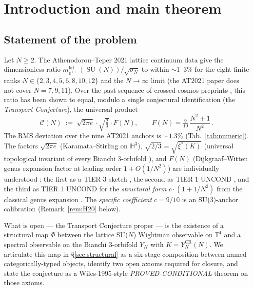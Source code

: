 \documentclass[11pt,a4paper,reqno]{amsart}
\theoremstyle{definition}
\DeclareMathOperator{\SU}{SU}
\newcommand{\YK}{Y_K}
\newcommand{\YKCR}{Y_K^{\mathrm{CR}}}
\newcommand{\HH}{\mathbb{H}}
\newcommand{\TT}{\mathbb{T}}
\newcommand{\xis}{\xi^{*}}
\begin{document}
\section{Introduction and main theorem}\label{sec:intro}

\subsection{Statement of the problem}\label{ss:problem}

Let $N\ge 2$. The Athenodorou--Teper 2021 lattice continuum data
\cite[Tab.~34]{AthenodorouTeper2021} give the dimensionless ratio
$m_{0^{++}}^{\mathrm{lat}}(\SU(N))/\sqrt{\sigma_N}$ to within $\sim 1$--$3\%$
for the eight finite ranks $N\in\{2,3,4,5,6,8,10,12\}$ and the
$N\to\infty$ limit (the AT2021 paper does not cover $N=7,9,11$).
Over the past sequence of crossed-cosmos preprints
\cite{Remondiere2026CR,Remondiere2026Selberg,Remondiere2026RouteB,
Remondiere2026CenterRank,Remondiere2026KASPmini,
Remondiere2026TransportV2}, this ratio has been shown to equal,
modulo a single conjectural identification (the \emph{Transport
Conjecture}), the universal product
\begin{equation}\label{eq:surrogate}
   \mathcal{C}(N) \;:=\; \sqrt{2\pi e}\cdot\sqrt{\tfrac{2}{3}}\cdot F(N),
   \qquad F(N) = \tfrac{9}{10}\,\frac{N^2+1}{N^2}\,.
\end{equation}
The RMS deviation over the nine AT2021 anchors is $\sim 1.3\%$
(Tab.~\ref{tab:numeric}). The factors $\sqrt{2\pi e}$
(Karamata--Stirling on $\HH^3$), $\sqrt{2/3} = \sqrt{\xis(K)}$
(universal topological invariant of every Bianchi 3-orbifold
\cite{Remondiere2026CR}), and $F(N)$ (Dijkgraaf--Witten genus
expansion factor at leading order $1+O(1/N^2)$) are individually
understood : the first as a TIER-3 sketch
\cite[\S 4]{Remondiere2026RouteB}, the second as TIER 1 UNCOND
\cite{Remondiere2026CR}, and the third as TIER 1 UNCOND for the
\emph{structural form} $c\cdot(1+1/N^2)$ from the classical genus
expansion \cite{tHooft1974}. The \emph{specific coefficient}
$c = 9/10$ is an SU(3)-anchor calibration (Remark~\ref{rem:H20} below).

What is open --- the Transport Conjecture proper --- is the existence
of a structural map $\Phi$ between the lattice SU($N$) Wightman
observable on $\TT^4$ and a spectral observable on the Bianchi
3-orbifold $\YK$ with $K = \YKCR(N)$. We articulate this map in
\S\ref{sec:structural} as a six-stage composition between named
categorically-typed objects, identify two open axioms required for
closure, and state the conjecture as a Wiles-1995-style
\emph{PROVED-CONDITIONAL} theorem on those axioms.
\end{document}
